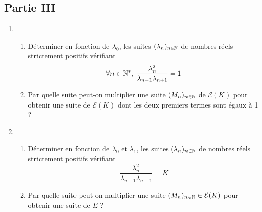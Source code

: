 \subsection*{Partie III}
\begin{enumerate}
  \item
\begin{enumerate}
  \item D{\'e}terminer en fonction de $\lambda_0$, les suites $(\lambda_n)_{n\in\mathbb{N}}$ de nombres r{\'e}els strictement positifs vérifiant
\begin{displaymath}
\forall n \in \mathbb{N}^*,\; \frac{\lambda_n^2}{\lambda_{n-1}\lambda_{n+1}}=1  
\end{displaymath}
  
  \item Par quelle suite peut-on multiplier une suite $(M_n)_{n\in\mathbb{N}}$ de $\mathcal{E}(K)$ pour obtenir une suite de $\mathcal{E}(K)$ dont les deux premiers termes sont {\'e}gaux {\`a} 1 ?
\end{enumerate}
  \item \begin{enumerate}
      \item D{\'e}terminer en fonction de $\lambda_0$ et $\lambda_1$, les suites $(\lambda_n)_{n\in\mathbb{N}}$ de nombres r{\'e}els strictement positifs vérifiant
\begin{displaymath}
\frac{\lambda_n^2}{\lambda_{n-1}\lambda_{n+1}}=K  
\end{displaymath}

 \item Par quelle suite peut-on multiplier une suite $(M_n)_{n\in\mathbb{N}} \in \mathcal{E}(K)$ pour obtenir une suite de $E$ ?
    \end{enumerate}
\end{enumerate}
